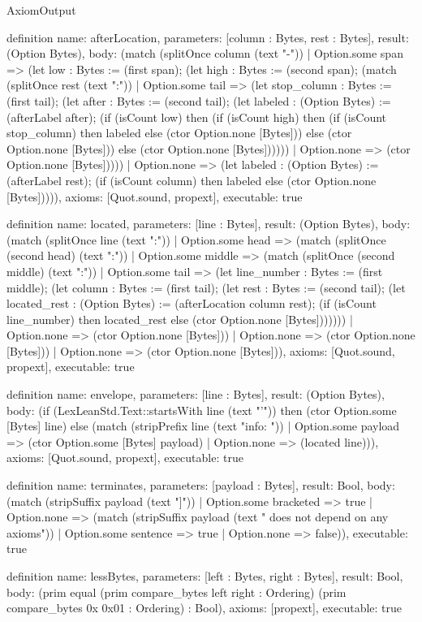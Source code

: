 \begin{lexlean}{AxiomOutput}
\begin{semanticmodule}
definition{
  name: afterLocation,
  parameters: [column : Bytes, rest : Bytes],
  result: (Option Bytes),
  body: (match (splitOnce column (text "-"))
    | Option.some span => (let low : Bytes := (first span); (let high : Bytes := (second span); (match (splitOnce rest (text ":"))
      | Option.some tail => (let stop_column : Bytes := (first tail); (let after : Bytes := (second tail); (let labeled : (Option Bytes) := (afterLabel after); (if (isCount low) then (if (isCount high) then (if (isCount stop_column) then labeled else (ctor Option.none [Bytes])) else (ctor Option.none [Bytes])) else (ctor Option.none [Bytes])))))
      | Option.none => (ctor Option.none [Bytes]))))
    | Option.none => (let labeled : (Option Bytes) := (afterLabel rest); (if (isCount column) then labeled else (ctor Option.none [Bytes])))),
  axioms: [Quot.sound, propext],
  executable: true
}

definition{
  name: located,
  parameters: [line : Bytes],
  result: (Option Bytes),
  body: (match (splitOnce line (text ":"))
    | Option.some head => (match (splitOnce (second head) (text ":"))
      | Option.some middle => (match (splitOnce (second middle) (text ":"))
        | Option.some tail => (let line_number : Bytes := (first middle); (let column : Bytes := (first tail); (let rest : Bytes := (second tail); (let located_rest : (Option Bytes) := (afterLocation column rest); (if (isCount line_number) then located_rest else (ctor Option.none [Bytes]))))))
        | Option.none => (ctor Option.none [Bytes]))
      | Option.none => (ctor Option.none [Bytes]))
    | Option.none => (ctor Option.none [Bytes])),
  axioms: [Quot.sound, propext],
  executable: true
}

definition{
  name: envelope,
  parameters: [line : Bytes],
  result: (Option Bytes),
  body: (if (LexLeanStd.Text::startsWith line (text "'")) then (ctor Option.some [Bytes] line) else (match (stripPrefix line (text "info: "))
    | Option.some payload => (ctor Option.some [Bytes] payload)
    | Option.none => (located line))),
  axioms: [Quot.sound, propext],
  executable: true
}

definition{
  name: terminates,
  parameters: [payload : Bytes],
  result: Bool,
  body: (match (stripSuffix payload (text "]"))
    | Option.some bracketed => true
    | Option.none => (match (stripSuffix payload (text " does not depend on any axioms"))
      | Option.some sentence => true
      | Option.none => false)),
  executable: true
}

definition{
  name: lessBytes,
  parameters: [left : Bytes, right : Bytes],
  result: Bool,
  body: (prim equal (prim compare_bytes left right : Ordering) (prim compare_bytes 0x 0x01 : Ordering) : Bool),
  axioms: [propext],
  executable: true
}


\end{semanticmodule}
\end{lexlean}
